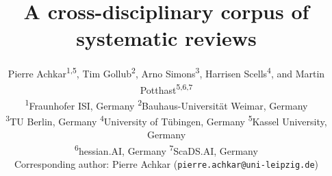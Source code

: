 \title{A cross-disciplinary corpus of systematic reviews}


\author{
  Pierre Achkar\textsuperscript{1,5},
  Tim Gollub\textsuperscript{2},
  Arno Simons\textsuperscript{3},
  Harrisen Scells\textsuperscript{4},
  and Martin Potthast\textsuperscript{5,6,7}
  \\[6pt]
  \small
  \textsuperscript{1}Fraunhofer ISI, Germany \quad
  \textsuperscript{2}Bauhaus-Universität Weimar, Germany \\
  \small
  \textsuperscript{3}TU Berlin, Germany \quad
  \textsuperscript{4}University of Tübingen, Germany \quad
  \textsuperscript{5}Kassel University, Germany \\
  \small
  \textsuperscript{6}hessian.AI, Germany \quad
  \textsuperscript{7}ScaDS.AI, Germany \\[4pt]
  \small Corresponding author: Pierre Achkar (\texttt{pierre.achkar@uni-leipzig.de})
}

\date{}
\maketitle

